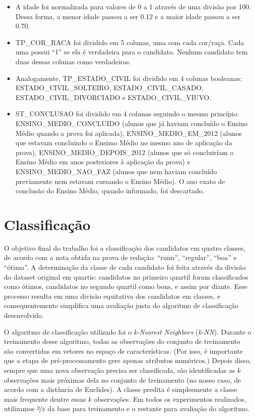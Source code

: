 \documentclass[12pt]{article}
\begin{document}
\begin{itemize}
    \item A idade foi normalizada para valores de 0 a 1 através de uma divisão por 100. Dessa forma, a menor idade passou a ser 0.12 e a maior idade passou a ser 0.70.
    \item TP\_COR\_RACA foi dividido em 5 colunas, uma com cada cor/raça. Cada uma possui ``1'' se ela é verdadeira para o candidato. Nenhum candidato tem duas dessas colunas como verdadeiras.
    \item Analogamente, TP\_ESTADO\_CIVIL foi dividido em 4 colunas booleanas: ESTADO\_CIVIL\_SOLTEIRO, ESTADO\_CIVIL\_CASADO, ESTADO\_CIVIL\_DIVORCIADO e ESTADO\_CIVIL\_VIUVO.
    \item ST\_CONCLUSAO foi dividido em 4 colunas seguindo o mesmo princípio: ENSINO\_MEDIO\_CONCLUIDO (alunos que já haviam concluído o Ensino Médio quando a prova foi aplicada), ENSINO\_MEDIO\_EM\_2012 (alunos que estavam concluindo o Ensimo Médio no mesmo ano de aplicação da prova), ENSINO\_MEDIO\_DEPOIS\_2012 (alunos que só concluiríam o Ensino Médio em anos posteriores à aplicação da prova) e ENSINO\_MEDIO\_NAO\_FAZ (alunos que nem haviam concluído previamente nem estavam cursando o Ensino Médio). O ano exato de conclusão do Ensino Médio, quando informado, foi descartado.
\end{itemize}

\section{Classificação}
\label{sec:classificacao}
O objetivo final do trabalho foi a classificação dos candidatos em quatro classes, de acordo com a nota obtida na prova de redação: ``ruim'', ``regular'', ``boa'' e ``ótima''.
A determinação da classe de cada candidato foi feita através da divisão do dataset original em quartis: candidatos no primeiro quartil foram classificados como ótimos, candidatos no segundo quartil como bons, e assim por diante.
Esse processo resulta em uma divisão equitativa dos candidatos em classes, e consequentemente simplifica uma avaliação justa do algoritmo de classificação desenvolvido.

O algoritmo de classificação utilizado foi o \emph{k-Nearest Neighbors} (\emph{k-NN}).
Durante o treinamento desse algoritmo, todas as observações do conjunto de treinamento são convertidas em vetores no espaço de características.
(Por isso, é importante que a etapa de pré-processamento gere apenas atributos numéricos.)
Depois disso, sempre que uma nova observação precisa ser classificada, são identificadas as $k$ observações mais próximas dela no conjunto de treinamento (no nosso caso, de acordo com a distância de Euclides).
A classe predita é simplesmente a classe mais frequente dentre essas $k$ observações.
Em todos os experimentos realizados, utilizamos $\nicefrac{2}{3}$ da base para treinamento e o restante para avaliação do algoritmo.
\end{document}
